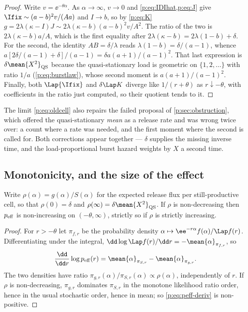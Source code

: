 \begin{proof}
Write $v=\ee^{-\theta\alpha}$. As $\alpha\to\infty$, $v\to0$ and
\cref{p:eq:IDIhat,p:eq:J} give $\Ifix\sim(a-b)^2v/(Aa)$ and $I\to b$, so by
\cref{p:eq:K} $g=2\lambda(\kappa-I)J\sim2\lambda(\kappa-b)(a-b)^2v/A^2$. The
ratio of the two is $2\lambda(\kappa-b)a/A$, which is the first equality
after $2\lambda(\kappa-b)=2\lambda(1-b)+\delta$. For the second, the
identity $AB=\delta/\lambda$ reads $\lambda(1-b)=\delta/(a-1)$, whence
$a[2\delta/(a-1)+\delta]/(a-1)=\delta a(a+1)/(a-1)^2$. That last expression
is $\delta\mean{X^2}_{\rm QS}$ because the quasi-stationary load is
geometric on $\{1,2,\ldots\}$ with ratio $1/a$ (\cref{p:eq:burstlaw}), whose
second moment is $a(a+1)/(a-1)^2$. Finally, both $\Lap{\Ifix}$ and
$\delta\Lap K$ diverge like $1/(r+\theta)$ as $r\downarrow-\theta$, with
coefficients in the ratio just computed, so their quotient tends to it.
\end{proof}

\noindent
The limit \cref{p:eq:oldcell} also repairs the failed proposal of
\cref{p:sec:obstruction}, which offered the quasi-stationary \emph{mean} as
a release rate and was wrong twice over: a count where a rate was needed,
and the first moment where the second is called for. Both corrections appear
together --- $\delta$ supplies the missing inverse time, and the
load-proportional burst hazard weights by $X$ a second time.

\subsection{Monotonicity, and the size of the effect}
\label{p:sec:span}

\begin{proposition}
\label{p:prop:peff-monotone}
Write $\rho(\alpha)=g(\alpha)/S(\alpha)$ for the expected release flux per
still-productive cell, so that $\rho(0)=\delta$ and
$\rho(\infty)=\delta\mean{X^2}_{\rm QS}$. If $\rho$ is non-decreasing then
$p_{\rm eff}$ is non-increasing on $(-\theta,\infty)$, strictly so if $\rho$
is strictly increasing.
\end{proposition}

\begin{proof}
For $r>-\theta$ let $\pi_{f,r}$ be the probability density
$\alpha\mapsto\ee^{-r\alpha}f(\alpha)/\Lap f(r)$. Differentiating under the
integral, $\dd\log\Lap f(r)/\dd r=-\mean{\alpha}_{\pi_{f,r}}$, so
\begin{equation}
\frac{\dd}{\dd r}\log p_{\rm eff}(r)
=\mean{\alpha}_{\pi_{S,r}}-\mean{\alpha}_{\pi_{g,r}}.
\label{p:eq:peff-deriv}
\end{equation}
The two densities have ratio
$\pi_{g,r}(\alpha)/\pi_{S,r}(\alpha)\propto\rho(\alpha)$, independently of
$r$. If $\rho$ is non-decreasing, $\pi_{g,r}$ dominates $\pi_{S,r}$ in the
monotone likelihood ratio order, hence in the usual stochastic order, hence
in mean; so \cref{p:eq:peff-deriv} is non-positive.
\end{proof}

